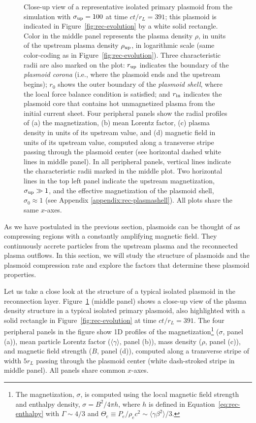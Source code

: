 \begin{figure}[htb]
{    }{
        \caption{Close-up view of a representative isolated primary plasmoid from the simulation with $\sigma_{\rm up}=100$ at time $ct/r_L=391$; this plasmoid is indicated in Figure~\ref{fig:rec-evolution} by a white solid rectangle. Color in the middle panel represents the plasma density $\rho$, in units of the upstream plasma density $\rho_{\rm up}$, in logarithmic scale (same color-coding as in Figure~\ref{fig:rec-evolution}). Three characteristic radii are also marked on the plot: $r_{\rm up}$ indicates the boundary of the {\it plasmoid corona} (i.e., where the plasmoid ends and the upstream begins); $r_0$ shows the outer boundary of the {\it plasmoid shell}, where the local force balance condition is satisfied; and $r_{\rm in}$ indicates the plasmoid core that contains hot unmagnetized plasma from the initial current sheet. Four peripheral panels show the radial profiles of (a) the magnetization, (b) mean Lorentz factor, (c) plasma density in units of its upstream value, and (d) magnetic field in units of its upstream value, computed along a transverse stripe passing through the plasmoid center (see horizontal dashed white lines in middle panel). In all peripheral panels, vertical lines indicate the characteristic radii marked in the middle plot. Two horizontal lines in the top left panel indicate the upstream magnetization, $\sigma_{\rm up} \gg 1$, and the effective magnetization of the plasmoid shell, $\sigma_0 \approx 1$ (see Appendix \ref{appendix:rec-plasmashell}). All plots share the same $x$-axes.}
        \label{fig:rec-plasm_example}
    }
\end{figure}

As we have postulated in the previous section, plasmoids can be thought of as compressing regions with a constantly amplifying magnetic field. They continuously accrete particles from the upstream plasma and the reconnected plasma outflows. In this section, we will study the structure of plasmoids and the plasmoid compression rate and explore the factors that determine these plasmoid properties. 

Let us take a close look at the structure of a typical isolated plasmoid in the reconnection layer. Figure~\ref{fig:rec-plasm_example} (middle panel) shows a close-up view of the plasma density structure in a typical isolated primary plasmoid, also highlighted with a solid rectangle in Figure~\ref{fig:rec-evolution} at time $ct/r_L = 391$. The four peripheral panels in the figure show 1D profiles of the magnetization\footnote{
The magnetization, $\sigma$, is computed using the local {magnetic field strength and} enthalpy density, $\sigma = B^2 / 4\pi h$, where  $h$ is defined in Equation~\eqref{eq:rec-enthalpy} with $\Gamma\sim 4/3$ and $\Theta_e\equiv P_e/\rho_ec^2 \sim \langle\gamma\beta^2\rangle$/3.}
($\sigma$, panel (a)), mean particle Lorentz factor ($\langle\gamma\rangle$, panel (b)), mass density ($\rho$, panel (c)), and magnetic field strength ($B$, panel (d)), computed along a transverse stripe of width $5r_L$ passing through the plasmoid center (white dash-stroked stripe in middle panel). 
All panels share common $x$-axes. 

